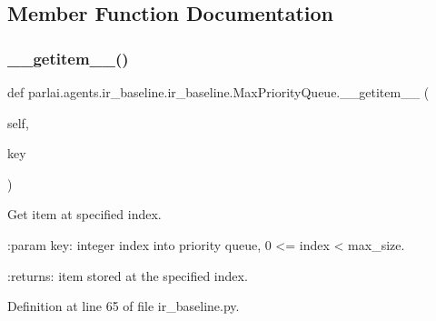 \subsection{Member Function Documentation}
\mbox{\label{classparlai_1_1agents_1_1ir__baseline_1_1ir__baseline_1_1MaxPriorityQueue_a7830895ac98617df15af4ba0fb991a05}} 
\subsubsection{\texorpdfstring{\+\_\+\+\_\+getitem\+\_\+\+\_\+()}{\_\_getitem\_\_()}}
{\footnotesize\ttfamily def parlai.\+agents.\+ir\+\_\+baseline.\+ir\+\_\+baseline.\+Max\+Priority\+Queue.\+\_\+\+\_\+getitem\+\_\+\+\_\+ (\begin{DoxyParamCaption}\item[{}]{self,  }\item[{}]{key }\end{DoxyParamCaption})}

\begin{DoxyVerb}Get item at specified index.

:param key: integer index into priority queue, 0 <= index < max_size.

:returns: item stored at the specified index.
\end{DoxyVerb}
 

Definition at line 65 of file ir\+\_\+baseline.\+py.



